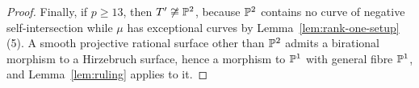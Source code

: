 \begin{proof}
Finally, if $p\geq 13$, then $T'\not\cong\mathbb{P}^2$, because $\mathbb{P}^2$ contains no curve of negative self-intersection while $\mu$ has exceptional curves by Lemma~\ref{lem:rank-one-setup}(5).
A smooth projective rational surface other than $\mathbb{P}^2$ admits a birational morphism to a Hirzebruch surface, hence a morphism to $\mathbb{P}^1$ with general fibre $\mathbb{P}^1$, and Lemma~\ref{lem:ruling} applies to it.
\end{proof}
